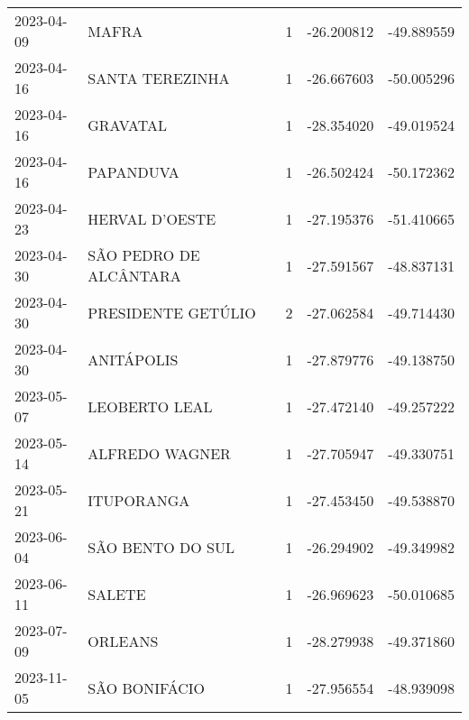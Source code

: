 \documentclass[
	12pt,				%
	openright,			%
	oneside,			%
	a4paper,			%
	english,			%
	french,				%
	spanish,			%
	brazil				%
	dvipsnames, table]{abntex2}
\begin{document}
\begin{longtable}[htbp]{llcrr}
2023-04-09 & MAFRA & 1 & -26.200812 & -49.889559 \\
2023-04-16 & SANTA TEREZINHA & 1 & -26.667603 & -50.005296 \\
2023-04-16 & GRAVATAL & 1 & -28.354020 & -49.019524 \\
2023-04-16 & PAPANDUVA & 1 & -26.502424 & -50.172362 \\
2023-04-23 & HERVAL D'OESTE & 1 & -27.195376 & -51.410665 \\
2023-04-30 & SÃO PEDRO DE ALCÂNTARA & 1 & -27.591567 & -48.837131 \\
2023-04-30 & PRESIDENTE GETÚLIO & 2 & -27.062584 & -49.714430 \\
2023-04-30 & ANITÁPOLIS & 1 & -27.879776 & -49.138750 \\
2023-05-07 & LEOBERTO LEAL & 1 & -27.472140 & -49.257222 \\
2023-05-14 & ALFREDO WAGNER & 1 & -27.705947 & -49.330751 \\
2023-05-21 & ITUPORANGA & 1 & -27.453450 & -49.538870 \\
2023-06-04 & SÃO BENTO DO SUL & 1 & -26.294902 & -49.349982 \\
2023-06-11 & SALETE & 1 & -26.969623 & -50.010685 \\
2023-07-09 & ORLEANS & 1 & -28.279938 & -49.371860 \\
2023-11-05 & SÃO BONIFÁCIO & 1 & -27.956554 & -48.939098 \\
\end{longtable}
\end{document}

